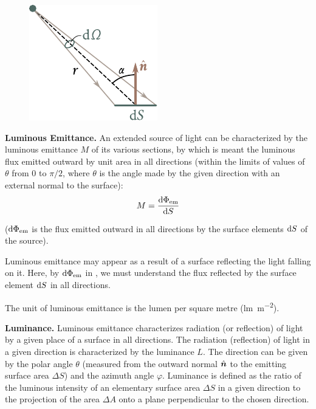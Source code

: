 \begin{figure}[t]
	\begin{center}
		\includegraphics[scale=1]{figures/ch_16/fig_16_4.pdf}
		\caption[]{}
		\label{fig:16_4}
	\end{center}
	\vspace{-0.8cm}
\end{figure}

\textbf{Luminous Emittance.}
An extended source of light can be characterized by the luminous emittance $M$ of its various sections, by which is meant the luminous flux emitted outward
by unit area in all directions (within the limits of values of $\theta$ from $0$ to $\pi/2$, where $\theta$ is the angle made by the given direction with an external normal to the surface):
\begin{equation}\label{eq:16_47}
    M = \dfrac{\mathrm{d}\Phi_{\text{em}}}{\mathrm{d} S}
\end{equation}

\noindent
($\mathrm{d}\Phi_{\text{em}}$ is the flux emitted outward in all directions by the surface elements $\mathrm{d} S$ of the source).

Luminous emittance may appear as a result of a surface reflecting the light falling on it.
Here, by $\mathrm{d}\Phi_{\text{em}}$ in , we must understand the flux reflected by the surface element $\mathrm{d} S$ in all directions.

The unit of luminous emittance is the lumen per square metre (\si{\lumen\per\metre\squared}).

\textbf{Luminance.}
Luminous emittance characterizes radiation (or reflection) of light by a given place of a surface in all directions.
The radiation (reflection) of light in a given direction is characterized by the luminance $L$.
The direction can be given by the polar angle $\theta$ (measured from the outward normal $\hat{\boldsymbol{n}}$ to the emitting surface area $\Delta{S}$) and the azimuth angle $\varphi$.
Luminance is defined as the ratio of the luminous intensity of an elementary surface area $\Delta{S}$ in a given direction to the projection of the area $\Delta{A}$ onto a plane perpendicular to the chosen direction.

